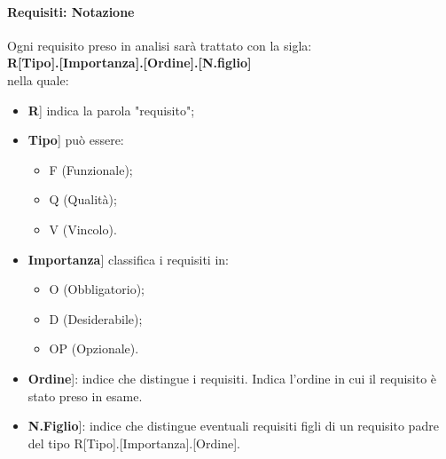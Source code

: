 \documentclass[10pt, a4paper]{article}
\begin{document}
\paragraph{Requisiti: Notazione\\}
Ogni requisito preso in analisi sarà trattato con la sigla:\\
\textbf{R[Tipo].[Importanza].[Ordine].[N.figlio]}\\
nella quale:
\begin{itemize}
\item \lbrack \textbf{R}] indica la parola "requisito";
\item \lbrack \textbf{Tipo}] può essere:
    \begin{itemize}
	\item F (Funzionale);
	\item Q (Qualità);
	\item V (Vincolo).
    \end{itemize}
\item \lbrack \textbf{Importanza}] classifica i requisiti in:
    \begin{itemize}
        \item O (Obbligatorio);
	\item D (Desiderabile);
	\item OP (Opzionale).
    \end{itemize}
\item \lbrack \textbf{Ordine}]: indice che distingue i requisiti. Indica l’ordine in cui il requisito è stato preso in esame.
\item \lbrack \textbf{N.Figlio}]: indice che distingue eventuali requisiti figli di un requisito padre del tipo R[Tipo].[Importanza].[Ordine].
\end{itemize}
\end{document}
